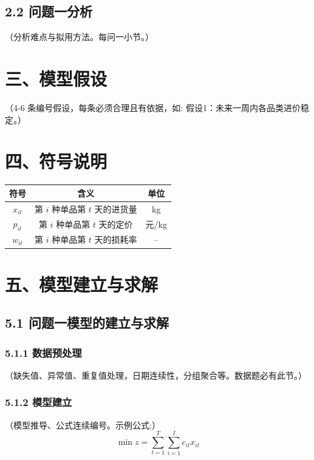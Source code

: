 \documentclass[12pt,a4paper,fontset=windows]{ctexart}
\begin{document}
\subsection*{2.2 问题一分析}
（分析难点与拟用方法。每问一小节。）

\section*{三、模型假设}

（4-6 条编号假设，每条必须合理且有依据，如: 假设1：未来一周内各品类进价稳定。）

\section*{四、符号说明}

\begin{table}[htbp]
\centering
\begin{tabular}{ccc}
\toprule
符号 & 含义 & 单位 \\
\midrule
$x_{it}$ & 第 $i$ 种单品第 $t$ 天的进货量 & kg \\
$p_{it}$ & 第 $i$ 种单品第 $t$ 天的定价 & 元/kg \\
$w_{it}$ & 第 $i$ 种单品第 $t$ 天的损耗率 & -- \\
\bottomrule
\end{tabular}
\end{table}

\section*{五、模型建立与求解}

\subsection*{5.1 问题一模型的建立与求解}

\subsubsection*{5.1.1 数据预处理}
（缺失值、异常值、重复值处理，日期连续性，分组聚合等。数据题必有此节。）

\subsubsection*{5.1.2 模型建立}
（模型推导、公式连续编号。示例公式:）
\begin{equation}
  \min z = \sum_{t=1}^{T}\sum_{i=1}^{I} c_{it} x_{it}
  \label{eq:objective}
\end{equation}
\end{document}
